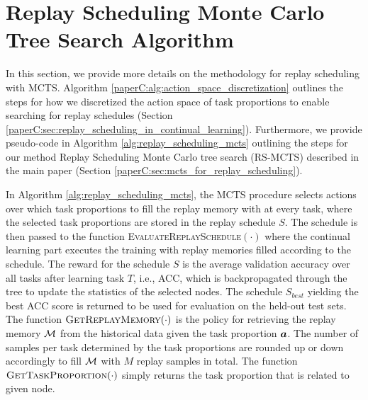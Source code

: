 

\section{Replay Scheduling Monte Carlo Tree Search Algorithm}\label{paperC:app:rs_mcts_algorithm}



In this section, we provide more details on the methodology for replay scheduling with MCTS. Algorithm \ref{paperC:alg:action_space_discretization} outlines the steps for how we discretized the action space of task proportions to enable searching for replay schedules (Section \ref{paperC:sec:replay_scheduling_in_continual_learning}). Furthermore, we provide pseudo-code in Algorithm \ref{alg:replay_scheduling_mcts} outlining the steps for our method Replay Scheduling Monte Carlo tree search (RS-MCTS) described in the main paper (Section \ref{paperC:sec:mcts_for_replay_scheduling}). 

In Algorithm \ref{alg:replay_scheduling_mcts}, the MCTS procedure selects actions over which task proportions to fill the replay memory with at every task, where the selected task proportions are stored in the replay schedule $S$. The schedule is then passed to 
the function \textsc{EvaluateReplaySchedule$(\cdot)$} 
where the continual learning part executes the training with replay memories filled according to the schedule. The reward for the schedule $S$ is the average validation accuracy over all tasks after learning task $T$, i.e., ACC, which is backpropagated through the tree to update the statistics of the selected nodes. The schedule $S_{best}$ yielding the best ACC score is returned to be used for evaluation on the held-out test sets. The function $\textsc{GetReplayMemory}(\cdot)$ is the policy for retrieving the replay memory ${\mathcal{M}}$ from the historical data given the task proportion ${\bm{a}}$. The number of samples per task determined by the task proportions are rounded up or down accordingly to fill ${\mathcal{M}}$ with $M$ replay samples in total. 
The function $\textsc{GetTaskProportion}(\cdot)$ simply returns the task proportion that is related to given node.


